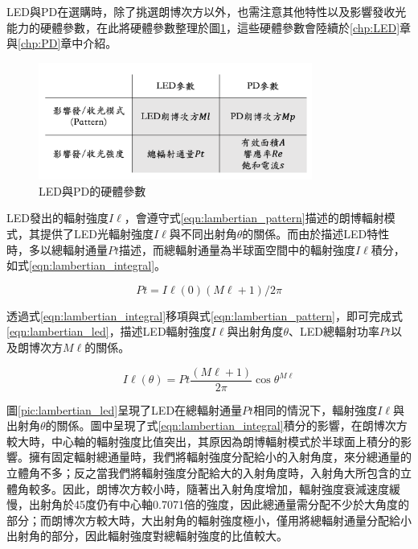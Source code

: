         LED與PD在選購時，除了挑選朗博次方以外，也需注意其他特性以及影響發收光能力的硬體參數，在此將硬體參數整理於圖\ref{pic:hardware_para}，這些硬體參數會陸續於\ref{chp:LED}章與\ref{chp:PD}章中介紹。
        
        \begin{figure}[ht]
            \centering
            \includegraphics[width=9cm]{ch2pic/hardware_para.png}
            \caption{LED與PD的硬體參數}
            \label{pic:hardware_para}
        \end{figure}

        LED發出的輻射強度$I\ell$，會遵守式\ref{eqn:lambertian_pattern}描述的朗博輻射模式，其提供了LED光輻射強度$I\ell$與不同出射角$\theta$的關係。而由於描述LED特性時，多以總輻射通量$Pt$描述，而總輻射通量為半球面空間中的輻射強度$I\ell$積分，如式\ref{eqn:lambertian_integral}。

        \begin{equation}
            \label{eqn:lambertian_integral}
            Pt = I\ell(0)(M\ell+1)/2\pi
        \end{equation}
        
        透過式\ref{eqn:lambertian_integral}移項與式\ref{eqn:lambertian_pattern}，即可完成式\ref{eqn:lambertian_led}，描述LED輻射強度$I\ell$與出射角度$\theta$、LED總輻射功率$Pt$以及朗博次方$M\ell$的關係。
    
        \begin{equation}
            \label{eqn:lambertian_led}
            I\ell(\theta)=Pt\frac{(M\ell+1)}{2 \pi} \cos \theta^{M\ell}
        \end{equation}

        圖\ref{pic:lambertian_led}呈現了LED在總輻射通量$Pt$相同的情況下，輻射強度$I\ell$與出射角$\theta$的關係。圖中呈現了式\ref{eqn:lambertian_integral}積分的影響，在朗博次方較大時，中心軸的輻射強度比值突出，其原因為朗博輻射模式於半球面上積分的影響。擁有固定輻射總通量時，我們將輻射強度分配給小的入射角度，來分總通量的立體角不多；反之當我們將輻射強度分配給大的入射角度時，入射角大所包含的立體角較多。因此，朗博次方較小時，隨著出入射角度增加，輻射強度衰減速度緩慢，出射角於45度仍有中心軸0.7071倍的強度，因此總通量需分配不少於大角度的部分；而朗博次方較大時，大出射角的輻射強度極小，僅用將總輻射通量分配給小出射角的部分，因此輻射強度對總輻射強度的比值較大。

